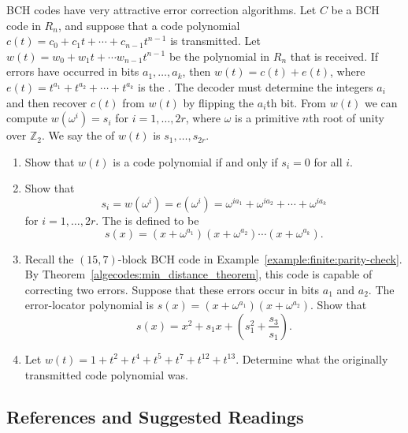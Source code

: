 {\small
BCH codes have very attractive error correction algorithms. Let $C$ be
a BCH code in $R_n$, and suppose that a code polynomial $c(t) = c_0 +
c_1 t + \cdots + c_{n-1} t^{n-1}$ is transmitted. Let $w(t) = w_0 +
w_1 t + \cdots w_{n-1} t^{n-1}$ be the polynomial in $R_n$ that is
received.  If errors have occurred in bits $a_1, \ldots, a_k$, then
$w(t) = c(t) + e(t)$, where $e(t) = t^{a_1} + t^{a_2} + \cdots +
t^{a_k}$ is the . The
decoder must determine the integers $a_i$ and then recover $c(t)$ from
$w(t)$ by flipping the $a_i$th bit. From $w(t)$ we can compute
$w( \omega^i ) = s_i$ for $i = 1, \ldots, 2r$, where $\omega$ is a
primitive $n$th root of unity over ${\mathbb Z}_2$. We say the  of $w(t)$ is $s_1, \ldots,
s_{2r}$. 
\begin{enumerate}

\item
Show that $w(t)$ is a code polynomial if and only if $s_i = 0$ for all
$i$. 

\item
Show that 
\[
s_i = w( \omega^i) = e( \omega^i) = \omega^{i a_1} + \omega^{i a_2} +
\cdots + \omega^{i a_k} 
\]
for $i = 1, \ldots, 2r$. The  is defined to be 
\[
s(x) = (x + \omega^{a_1})(x + \omega^{a_2}) \cdots  (x +
\omega^{a_k}). 
\]

\item
Recall the $(15,7)$-block BCH code in Example~\ref{example:finite:parity-check}.  By Theorem~\ref{algecodes:min_distance_theorem}, this
code is capable of correcting two errors. Suppose that these errors
occur in bits $a_1$ and $a_2$. The error-locator polynomial
is $s(x) = (x + \omega^{a_1})(x + \omega^{a_2})$. Show that
\[
s(x) = x^2 + s_1 x + \left( s_1^2 + \frac{s_3}{s_1} \right).
\]


\item
Let $w(t) = 1 + t^2 +t^4 + t^5 + t^7 + t^{12} + t^{13}$. Determine
what the originally transmitted code polynomial was.

\end{enumerate}


}



\subsection*{References and Suggested Readings}
 

